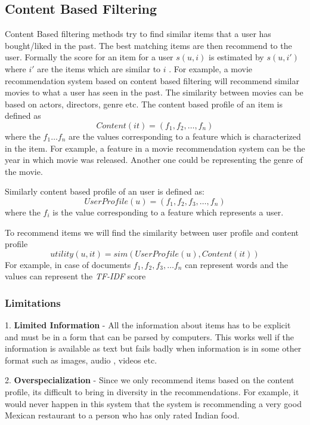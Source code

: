 \subsection{Content Based Filtering}

Content Based filtering methods try to find similar items that a user has bought/liked in the past. The best matching items are then recommend to the user. Formally the score for an item for a user $s(u,i)$ is estimated by $s(u,i')$ where $i'$ are the items which are similar to $i$ . For example, a movie recommendation system based on content based filtering will recommend similar movies to what a user has seen in the past. The similarity between movies can be based on actors, directors, genre etc. The content based profile of an item is defined as
\begin{equation}
Content(it) = (f_1,f_2,\dots, f_n) 
\end{equation}
where the $f_1\dots f_n$ are the values corresponding to a feature which is characterized in the item. For example, a feature in a movie recommendation system can be the year in which movie was released. Another one could be representing the genre of the movie.

Similarly content based profile of an user is defined as:
\begin{equation}
UserProfile(u) = (f_1,f_2,f_3,\dots, f_n)
\end{equation}
where the $f_i$ is the value corresponding to a feature which represents a user.

To recommend items we will find the similarity between user profile and content profile
\begin{equation}
utility(u,it) = sim(UserProfile(u), Content(it))
\end{equation}
For example, in case of documents $f_1,f_2,f_3,\dots f_n$ can represent words and the values can represent the \textit{TF-IDF} score

\subsubsection{Limitations}

1. {\bf Limited Information} - All the information about items has to be explicit and must be in a form that can be parsed by computers. This works well if the information is available as text but fails badly when information is in some other format such as images, audio , videos etc.

2. {\bf Overspecialization} - Since we only recommend items based on the content profile, its difficult to bring in diversity in the recommendations. For example, it would never happen in this system that the system is recommending a very good Mexican restaurant to a person who has only rated Indian food.

